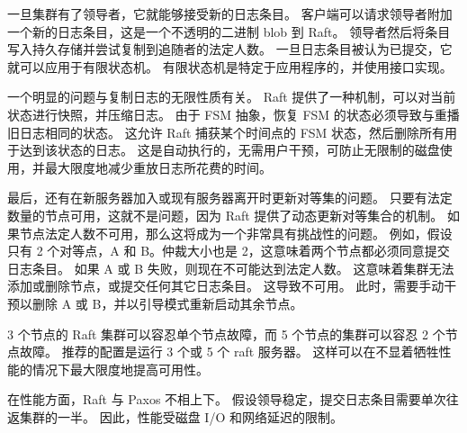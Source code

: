 		一旦集群有了领导者，它就能够接受新的日志条目。 
		客户端可以请求领导者附加一个新的日志条目，这是一个不透明的二进制 blob 到 Raft。 
		领导者然后将条目写入持久存储并尝试复制到追随者的法定人数。 
		一旦日志条目被认为已提交，它就可以应用于有限状态机。 
		有限状态机是特定于应用程序的，并使用接口实现。
		
		一个明显的问题与复制日志的无限性质有关。 
		Raft 提供了一种机制，可以对当前状态进行快照，并压缩日志。 
		由于 FSM 抽象，恢复 FSM 的状态必须导致与重播旧日志相同的状态。 
		这允许 Raft 捕获某个时间点的 FSM 状态，然后删除所有用于达到该状态的日志。 
		这是自动执行的，无需用户干预，可防止无限制的磁盘使用，并最大限度地减少重放日志所花费的时间。
		
		最后，还有在新服务器加入或现有服务器离开时更新对等集的问题。 
		只要有法定数量的节点可用，这就不是问题，因为 Raft 提供了动态更新对等集合的机制。 
		如果节点法定人数不可用，那么这将成为一个非常具有挑战性的问题。 
		例如，假设只有 2 个对等点，A 和 B。仲裁大小也是 2，这意味着两个节点都必须同意提交日志条目。 
		如果 A 或 B 失败，则现在不可能达到法定人数。 
		这意味着集群无法添加或删除节点，或提交任何其它日志条目。 
		这导致不可用。 此时，需要手动干预以删除 A 或 B，并以引导模式重新启动其余节点。
		
		3 个节点的 Raft 集群可以容忍单个节点故障，而 5 个节点的集群可以容忍 2 个节点故障。 
		推荐的配置是运行 3 个或 5 个 raft 服务器。 这样可以在不显着牺牲性能的情况下最大限度地提高可用性。
		
		在性能方面，Raft 与 Paxos 不相上下。 
		假设领导稳定，提交日志条目需要单次往返集群的一半。 
		因此，性能受磁盘 I/O 和网络延迟的限制。
	
	
	
			
		
	
	\clearpage
	
	
